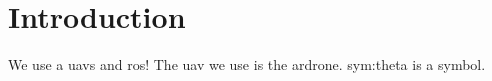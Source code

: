 \chapter{Introduction}
We use a \glspl{uav} and \gls{ros}! The \gls{uav} we use is the \gls{ardrone}. \gls{sym:theta} is a symbol.
